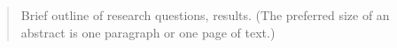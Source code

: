 \begin{abstract}
Brief outline of research questions, results.
(The preferred size of an abstract is one paragraph or one page of text.)
\end{abstract}
